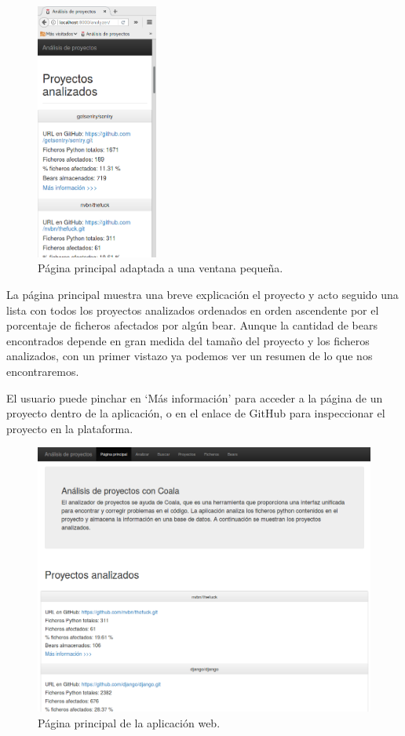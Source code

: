 \documentclass[a4paper, 12pt]{book}
\begin{document}
\begin{figure}[H]
  \centering
  \includegraphics[width=4cm, keepaspectratio]{img/webAdaptativa}
  \caption{Página principal adaptada a una ventana pequeña.}
  \label{fig:webAdaptativa}
\end{figure}

La página principal muestra una breve explicación el proyecto y acto seguido una lista con todos los proyectos analizados ordenados en orden ascendente por el porcentaje de ficheros afectados por algún bear. Aunque la cantidad de bears encontrados depende en gran medida del tamaño del proyecto y los ficheros analizados, con un primer vistazo ya podemos ver un resumen de lo que nos encontraremos.

El usuario puede pinchar en `Más información' para acceder a la página de un proyecto dentro de la aplicación, o en el enlace de GitHub para inspeccionar el proyecto en la plataforma.

\begin{figure}[H]
  \centering
  \includegraphics[width=12cm, keepaspectratio]{img/homePage}
  \caption{Página principal de la aplicación web.}
  \label{fig:homePage}
\end{figure}
\end{document}
